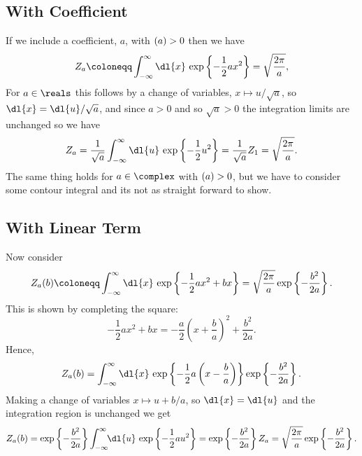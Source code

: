 \documentclass[fleqn]{NotesClass}
\let\Re\relax
\DeclareMathOperator{\Re}{Re}
\begin{document}
    \subsection{With Coefficient}
    If we include a coefficient, \(a\), with \(\Re(a) > 0\) then we have
    \begin{equation}
        Z_a \coloneqq \int_{-\infty}^{\infty} \dl{x} \, \exp\left\{ -\frac{1}{2}ax^2 \right\} = \sqrt{\frac{2\pi}{a}},
    \end{equation}
    For \(a \in \reals\) this follows by a change of variables, \(x \mapsto u/\sqrt{a}\), so \(\dl{x} = \dl{u}/\sqrt{a}\), and since \(a > 0\) and so \(\sqrt{a} > 0\) the integration limits are unchanged so we have
    \begin{equation}
        Z_a = \frac{1}{\sqrt{a}} \int_{-\infty}^{\infty} \dl{u} \, \exp\left\{ -\frac{1}{2}u^2 \right\} = \frac{1}{\sqrt{a}} Z_1 = \sqrt{\frac{2\pi}{a}}.
    \end{equation}
    The same thing holds for \(a \in \complex\) with \(\Re(a) > 0\), but we have to consider some contour integral and its not as straight forward to show.
    
    \subsection{With Linear Term}
    Now consider
    \begin{equation}\label{eqn:gaussian 1d with linear term}
        Z_a(b) \coloneqq \int_{-\infty}^{\infty} \dl{x} \, \exp\left\{ -\frac{1}{2}ax^2 + bx \right\} = \sqrt{\frac{2\pi}{a}} \exp\left\{ -\frac{b^2}{2a} \right\}.
    \end{equation}
    This is shown by completing the square:
    \begin{equation}
        -\frac{1}{2}ax^2 + bx = -\frac{a}{2}\left( x + \frac{b}{a} \right)^2 + \frac{b^2}{2a}.
    \end{equation}
    Hence,
    \begin{equation}
        Z_a(b) = \int_{-\infty}^{\infty} \dl{x} \, \exp\left\{ -\frac{1}{2}a\left( x - \frac{b}{a} \right) \right\} \exp\left\{ -\frac{b^2}{2a} \right\}.
    \end{equation}
    Making a change of variables \(x \mapsto u + b/a\), so \(\dl{x} = \dl{u}\) and the integration region is unchanged we get
    \begin{equation*}
        Z_a(b) = \exp\left\{ -\frac{b^2}{2a} \right\} \int_{-\infty}^{\infty} \!\! \dl{u} \, \exp\left\{ -\frac{1}{2}au^2 \right\} = \exp\left\{ -\frac{b^2}{2a} \right\} Z_a = \sqrt{\frac{2\pi}{a}} \exp\left\{ -\frac{b^2}{2a} \right\}.
    \end{equation*}
    
\end{document}
